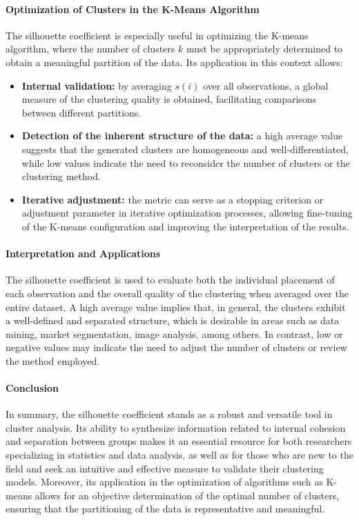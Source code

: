\documentclass[10pt]{article}
\begin{document}
\paragraph{Optimization of Clusters in the K-Means Algorithm}  
The silhouette coefficient is especially useful in optimizing the K-means algorithm, where the number of clusters \( k \) must be appropriately determined to obtain a meaningful partition of the data. Its application in this context allows:
\begin{itemize}
    \item \textbf{Internal validation:} by averaging \( s(i) \) over all observations, a global measure of the clustering quality is obtained, facilitating comparisons between different partitions.
    \item \textbf{Detection of the inherent structure of the data:} a high average value suggests that the generated clusters are homogeneous and well-differentiated, while low values indicate the need to reconsider the number of clusters or the clustering method.
    \item \textbf{Iterative adjustment:} the metric can serve as a stopping criterion or adjustment parameter in iterative optimization processes, allowing fine-tuning of the K-means configuration and improving the interpretation of the results.
\end{itemize}


\paragraph{Interpretation and Applications}  
The silhouette coefficient is used to evaluate both the individual placement of each observation and the overall quality of the clustering when averaged over the entire dataset. A high average value implies that, in general, the clusters exhibit a well-defined and separated structure, which is desirable in areas such as data mining, market segmentation, image analysis, among others. In contrast, low or negative values may indicate the need to adjust the number of clusters or review the method employed.

\paragraph{Conclusion}  
In summary, the silhouette coefficient stands as a robust and versatile tool in cluster analysis. Its ability to synthesize information related to internal cohesion and separation between groups makes it an essential resource for both researchers specializing in statistics and data analysis, as well as for those who are new to the field and seek an intuitive and effective measure to validate their clustering models. Moreover, its application in the optimization of algorithms such as K-means allows for an objective determination of the optimal number of clusters, ensuring that the partitioning of the data is representative and meaningful.
\end{document}
